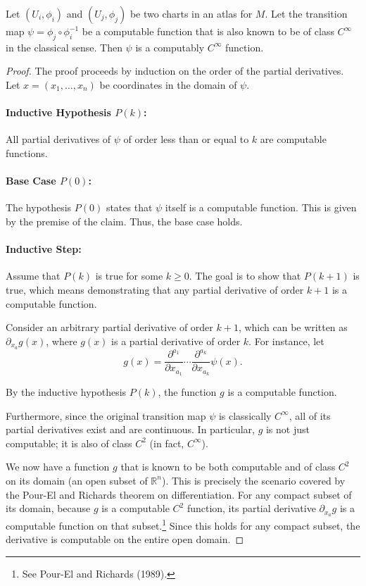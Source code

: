 \documentclass[12pt, a4paper]{article}
\begin{document}
\begin{claim}
Let $(U_i, \phi_i)$ and $(U_j, \phi_j)$ be two charts in an atlas for $M$. Let the transition map $\psi = \phi_j \circ \phi_i^{-1}$ be a computable function that is also known to be of class $C^\infty$ in the classical sense. Then $\psi$ is a computably $C^\infty$ function.
\end{claim}

\begin{proof}
The proof proceeds by induction on the order of the partial derivatives. Let $x = (x_1, \ldots, x_n)$ be coordinates in the domain of $\psi$.

\paragraph{Inductive Hypothesis $P(k)$:} All partial derivatives of $\psi$ of order less than or equal to $k$ are computable functions.

\paragraph{Base Case $P(0)$:} The hypothesis $P(0)$ states that $\psi$ itself is a computable function. This is given by the premise of the claim. Thus, the base case holds.

\paragraph{Inductive Step:} Assume that $P(k)$ is true for some $k \geq 0$. The goal is to show that $P(k+1)$ is true, which means demonstrating that any partial derivative of order $k+1$ is a computable function.

Consider an arbitrary partial derivative of order $k+1$, which can be written as $\partial_{x_a} g(x)$, where $g(x)$ is a partial derivative of order $k$. For instance, let
\[
g(x) = \frac{\partial^{a_1}}{\partial x_{a_1}} \cdots \frac{\partial^{a_k}}{\partial x_{a_k}} \psi(x).
\]

By the inductive hypothesis $P(k)$, the function $g$ is a computable function.

Furthermore, since the original transition map $\psi$ is classically $C^\infty$, all of its partial derivatives exist and are continuous. In particular, $g$ is not just computable; it is also of class $C^2$ (in fact, $C^\infty$).

We now have a function $g$ that is known to be both computable and of class $C^2$ on its domain (an open subset of $\mathbb{R}^n$). This is precisely the scenario covered by the Pour-El and Richards theorem on differentiation. For any compact subset of its domain, because $g$ is a computable $C^2$ function, its partial derivative $\partial_{x_a} g$ is a computable function on that subset.\footnote{See Pour-El and Richards (1989).} Since this holds for any compact subset, the derivative is computable on the entire open domain.


\end{proof}
\end{document}

